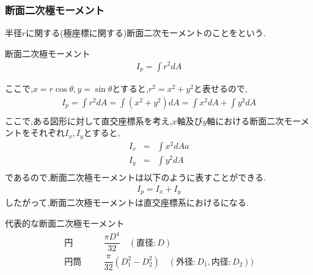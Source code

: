 \documentclass[a4paper]{jsarticle}
\begin{document}
\subsubsection{断面二次極モーメント}
半径$r$に関する(極座標に関する)断面二次モーメントのことをという.
\begin{itembox}[l]{断面二次極モーメント}
    \begin{eqnarray*}
        \displaystyle I_p=\int r^2dA
    \end{eqnarray*}
\end{itembox}
ここで,$x=r\cos\theta,y=\sin\theta$とすると,$r^2=x^2+y^2$と表せるので,
\begin{eqnarray*}
    \displaystyle I_p=\int r^2dA=\int \left(x^2+y^2\right)dA=\int x^2dA+\int y^2dA\\
\end{eqnarray*}
ここで,ある図形に対して直交座標系を考え,$x$軸及び$y$軸における断面二次モーメントをそれぞれ$I_x,I_y$とすると,
\begin{eqnarray*}
    \displaystyle
    I_x&=&\int x^2dAa\\
    I_y&=&\int y^2dA\\
\end{eqnarray*}
であるので,断面二次極モーメントは以下のように表すことができる.
\begin{eqnarray*}
    I_p=I_x+I_y
\end{eqnarray*}
したがって,断面二次極モーメントは直交座標系におけるになる.\\
\begin{itembox}[l]{代表的な断面二次極モーメント}
    \begin{eqnarray*}
        円\qquad&&\dfrac{\pi D^4}{32}\quad(直径:D)\\
        円筒\quad&&\dfrac{\pi}{32}\left(D_1^2-D_2^2\right)\quad(外径:D_1,内径:D_2))\\
    \end{eqnarray*}
\end{itembox}
\end{document}
